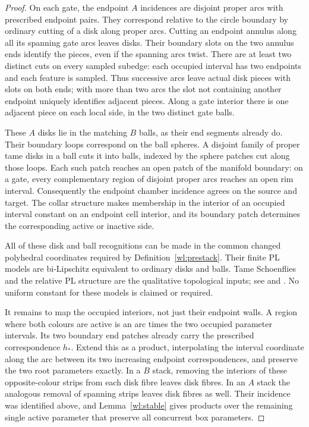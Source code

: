 \begin{proof}
On each gate, the endpoint $A$ incidences are disjoint proper arcs
with prescribed endpoint pairs.  They correspond relative to the
circle boundary by ordinary cutting of a disk along proper arcs.
Cutting an endpoint annulus along all its spanning gate arcs leaves
disks.  Their boundary slots on the two annulus ends identify the
pieces, even if the spanning arcs twist.  There are at least two
distinct cuts on every sampled subedge: each occupied interval has
two endpoints and each feature is sampled.  Thus successive arcs
leave actual disk pieces with slots on both ends; with more than
two arcs the slot not containing another endpoint uniquely
identifies adjacent pieces.  Along a gate interior there is one
adjacent piece on each local side, in the two distinct gate balls.

These $A$ disks lie in the matching $B$ balls, as their end segments
already do.  Their boundary loops correspond on the ball spheres.
A disjoint family of proper tame disks in a ball cuts it into balls,
indexed by the sphere patches cut along those loops.  Each such
patch reaches an open patch of the manifold boundary: on a gate,
every complementary region of disjoint proper arcs reaches an open
rim interval.  Consequently the endpoint chamber incidence agrees
on the source and target.  The collar structure makes membership
in the interior of an occupied interval constant on an endpoint
cell interior, and its boundary patch determines the corresponding
active or inactive side.

All of these disk and ball recognitions can be made in the common
changed polyhedral coordinates required by
Definition~\ref{wl:prestack}.  Their finite PL models are
bi-Lipschitz equivalent to ordinary disks and balls.  Tame
Schoenflies and the relative PL structure are the qualitative
topological inputs; see \cite[Theorem~5]{Brown1960} and
\cite[Theorem~2.2]{Hamilton1976}.  No uniform constant for these
models is claimed or required.

It remains to map the occupied interiors, not just their endpoint
walls.  A region where both colours are active is an arc times the
two occupied parameter intervals.  Its two boundary end patches
already carry the prescribed correspondence $h_*$.  Extend this as
a product, interpolating the interval coordinate along the arc
between its two increasing endpoint correspondences, and preserve
the two root parameters exactly.  In a $B$ stack, removing the
interiors of these opposite-colour strips from each disk fibre
leaves disk fibres.  In an $A$ stack the analogous removal of
spanning strips leaves disk fibres as well.  Their incidence was
identified above, and Lemma~\ref{wl:stable} gives products over the
remaining single active parameter that preserve all concurrent
box parameters.


\end{proof}

